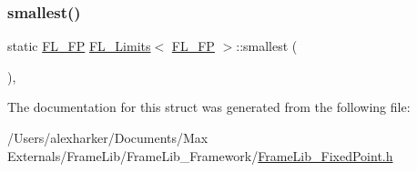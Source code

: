 \mbox{\label{struct_f_l___limits_3_01_f_l___f_p_01_4_abbe30add075e57d481380848b101b1d5}} 
\subsubsection{\texorpdfstring{smallest()}{smallest()}}
{\footnotesize\ttfamily static \hyperlink{class_f_l___f_p}{F\+L\+\_\+\+FP} \hyperlink{struct_f_l___limits}{F\+L\+\_\+\+Limits}$<$ \hyperlink{class_f_l___f_p}{F\+L\+\_\+\+FP} $>$\+::smallest (\begin{DoxyParamCaption}{ }\end{DoxyParamCaption})\hspace{0.3cm}{\ttfamily [inline]}, {\ttfamily [static]}}



The documentation for this struct was generated from the following file\+:\begin{DoxyCompactItemize}
\item 
/\+Users/alexharker/\+Documents/\+Max Externals/\+Frame\+Lib/\+Frame\+Lib\+\_\+\+Framework/\hyperlink{_frame_lib___fixed_point_8h}{Frame\+Lib\+\_\+\+Fixed\+Point.\+h}\end{DoxyCompactItemize}
